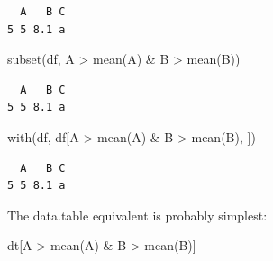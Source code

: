 \documentclass[
]{book}
\newenvironment{Shaded}{\begin{snugshade}}{\end{snugshade}}
\newcommand{\FunctionTok}[1]{\textcolor[rgb]{0.00,0.00,0.00}{#1}}
\newcommand{\NormalTok}[1]{#1}
\newcommand{\SpecialCharTok}[1]{\textcolor[rgb]{0.00,0.00,0.00}{#1}}
\begin{document}
\begin{Shaded}
\end{Shaded}

\begin{verbatim}
  A   B C
5 5 8.1 a
\end{verbatim}

\begin{Shaded}
\begin{Highlighting}[]
\FunctionTok{subset}\NormalTok{(df, A }\SpecialCharTok{\textgreater{}} \FunctionTok{mean}\NormalTok{(A) }\SpecialCharTok{\&}\NormalTok{ B }\SpecialCharTok{\textgreater{}} \FunctionTok{mean}\NormalTok{(B))}
\end{Highlighting}
\end{Shaded}

\begin{verbatim}
  A   B C
5 5 8.1 a
\end{verbatim}

\begin{Shaded}
\begin{Highlighting}[]
\FunctionTok{with}\NormalTok{(df, df[A }\SpecialCharTok{\textgreater{}} \FunctionTok{mean}\NormalTok{(A) }\SpecialCharTok{\&}\NormalTok{ B }\SpecialCharTok{\textgreater{}} \FunctionTok{mean}\NormalTok{(B), ])}
\end{Highlighting}
\end{Shaded}

\begin{verbatim}
  A   B C
5 5 8.1 a
\end{verbatim}

The data.table equivalent is probably simplest:

\begin{Shaded}
\begin{Highlighting}[]
\NormalTok{dt[A }\SpecialCharTok{\textgreater{}} \FunctionTok{mean}\NormalTok{(A) }\SpecialCharTok{\&}\NormalTok{ B }\SpecialCharTok{\textgreater{}} \FunctionTok{mean}\NormalTok{(B)]}
\end{Highlighting}
\end{Shaded}
\end{document}
